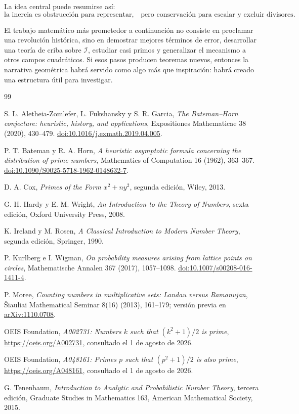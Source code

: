 \documentclass[11pt,a4paper,openany]{report}
\newcommand{\Iset}{\mathcal{I}}
\begin{document}
La idea central puede resumirse así:
\[
 \boxed{
 \text{la inercia es obstrucción para representar,}
 \quad
 \text{pero conservación para escalar y excluir divisores.}}
\]

El trabajo matemático más prometedor a continuación no consiste en proclamar una revolución histórica, sino en demostrar mejores términos de error, desarrollar una teoría de criba sobre \(\Iset\), estudiar casi primos y generalizar el mecanismo a otros campos cuadráticos. Si esos pasos producen teoremas nuevos, entonces la narrativa geométrica habrá servido como algo más que inspiración: habrá creado una estructura útil para investigar.

\begin{thebibliography}{99}

S. L. Aletheia-Zomlefer, L. Fukshansky y S. R. Garcia,
\emph{The Bateman--Horn conjecture: heuristic, history, and applications},
Expositiones Mathematicae 38 (2020), 430--479.
\href{https://doi.org/10.1016/j.exmath.2019.04.005}{doi:10.1016/j.exmath.2019.04.005}.

P. T. Bateman y R. A. Horn,
\emph{A heuristic asymptotic formula concerning the distribution of prime numbers},
Mathematics of Computation 16 (1962), 363--367.
\href{https://doi.org/10.1090/S0025-5718-1962-0148632-7}{doi:10.1090/S0025-5718-1962-0148632-7}.

D. A. Cox,
\emph{Primes of the Form \(x^2+ny^2\)}, segunda edición,
Wiley, 2013.

G. H. Hardy y E. M. Wright,
\emph{An Introduction to the Theory of Numbers}, sexta edición,
Oxford University Press, 2008.

K. Ireland y M. Rosen,
\emph{A Classical Introduction to Modern Number Theory}, segunda edición,
Springer, 1990.

P. Kurlberg e I. Wigman,
\emph{On probability measures arising from lattice points on circles},
Mathematische Annalen 367 (2017), 1057--1098.
\href{https://doi.org/10.1007/s00208-016-1411-4}{doi:10.1007/s00208-016-1411-4}.

P. Moree,
\emph{Counting numbers in multiplicative sets: Landau versus Ramanujan},
Šiauliai Mathematical Seminar 8(16) (2013), 161--179;
versión previa en \href{https://arxiv.org/abs/1110.0708}{arXiv:1110.0708}.

OEIS Foundation,
\emph{A002731: Numbers \(k\) such that \((k^2+1)/2\) is prime},
\url{https://oeis.org/A002731}, consultado el 1 de agosto de 2026.

OEIS Foundation,
\emph{A048161: Primes \(p\) such that \((p^2+1)/2\) is also prime},
\url{https://oeis.org/A048161}, consultado el 1 de agosto de 2026.

G. Tenenbaum,
\emph{Introduction to Analytic and Probabilistic Number Theory}, tercera edición,
Graduate Studies in Mathematics 163, American Mathematical Society, 2015.

\end{thebibliography}
\end{document}
